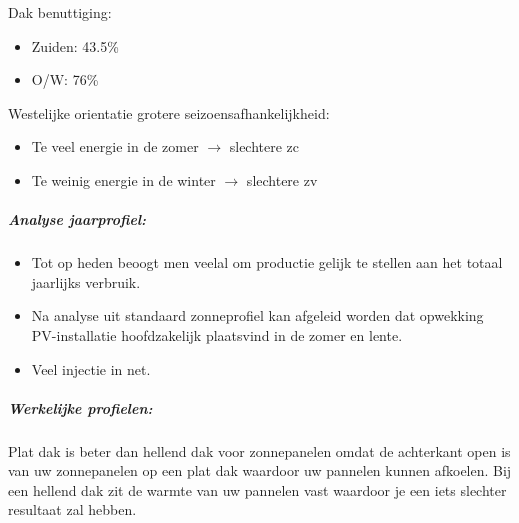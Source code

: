 \documentclass[12pt]{article}
\begin{document}
Dak benuttiging:\begin{itemize}
    \item Zuiden: 43.5\%
    \item O/W: 76\%
\end{itemize}
Westelijke orientatie grotere seizoensafhankelijkheid:\begin{itemize}
    \item Te veel energie in de zomer $\rightarrow$ slechtere zc 
    \item Te weinig energie in de winter $\rightarrow$ slechtere zv
\end{itemize}
\subparagraph{Analyse jaarprofiel:}
\begin{itemize}
    \item Tot op heden beoogt men veelal om productie gelijk te stellen aan het totaal jaarlijks verbruik.
    \item Na analyse uit standaard zonneprofiel kan afgeleid worden dat opwekking PV-installatie hoofdzakelijk plaatsvind in de zomer en lente.
    \item Veel injectie in net.
\end{itemize}
\subparagraph{Werkelijke profielen:}
Plat dak is beter dan hellend dak voor zonnepanelen omdat de achterkant open is van uw zonnepanelen op een plat dak waardoor uw pannelen kunnen afkoelen. Bij een hellend dak zit de warmte van uw pannelen vast waardoor je een iets slechter resultaat zal hebben.
\end{document}
